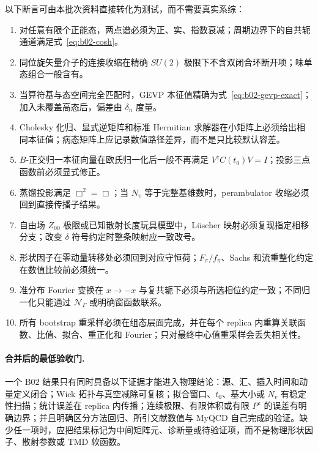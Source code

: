 以下断言可由本批次资料直接转化为测试，而不需要真实系综：
\begin{enumerate}
  \item 对任意有限个正能态，两点谱必须为正、实、指数衰减；周期边界下的自共轭通道满足式~\eqref{eq:b02-cosh}。
  \item 同位旋矢量介子的连接收缩在精确 \(SU(2)\) 极限下不含双闭合环断开项；味单态组合一般含有。
  \item 当算符基与态空间完全匹配时，GEVP 本征值精确为式~\eqref{eq:b02-gevp-exact}；加入未覆盖高态后，偏差由 \(\delta_n\) 度量。
  \item Cholesky 化归、显式逆矩阵和标准 Hermitian 求解器在小矩阵上必须给出相同本征值；病态矩阵上应记录数值路径差异，而不是只比较默认容差。
  \item \(B\)-正交归一本征向量在欧氏归一化后一般不再满足 \(V^\dagger C(t_0)V=I\)；投影三点函数前必须显式修正。
  \item 蒸馏投影满足 \(\Box^2=\Box\)；当 \(N_v\) 等于完整基维数时，perambulator 收缩必须回到直接传播子结果。
  \item 自由场 \(Z_{00}\) 极限或已知散射长度玩具模型中，Lüscher 映射必须复现指定相移分支；改变 \(\delta\) 符号约定时整条映射应一致改号。
  \item 形状因子在零动量转移处必须回到对应守恒荷；\(F_\pi/f_\pi\)、Sachs 和流重整化约定在数值比较前必须统一。
  \item 准分布 Fourier 变换在 \(x\to-x\) 与复共轭下必须与所选相位约定一致；不同归一化只能通过 \(\mathcal N_\Gamma\) 或明确窗函数联系。
  \item 所有 bootstrap 重采样必须在组态层面完成，并在每个 replica 内重算关联函数、比值、拟合、重正化和 Fourier；只对最终中心值重采样会丢失相关性。
\end{enumerate}

\paragraph{合并后的最低验收门.}
一个 B02 结果只有同时具备以下证据才能进入物理结论：源、汇、插入时间和动量定义闭合；Wick 拓扑与真空减除可复核；拟合窗口、\(t_0\)、基大小或 \(N_v\) 有稳定性扫描；统计误差在 replica 内传播；连续极限、有限体积或有限 \(P^z\) 的误差有明确边界；并且明确区分方法回归、所引文献数值与 MyQCD 自己完成的验证。缺少任一项时，应把结果标记为中间矩阵元、诊断量或待验证项，而不是物理形状因子、散射参数或 TMD 软函数。
